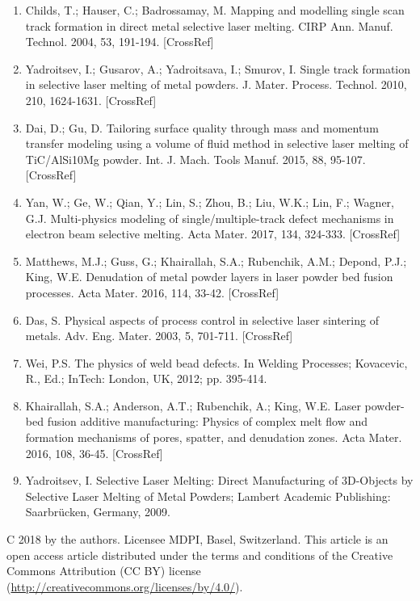 \documentclass[10pt]{article}
\begin{document}
\begin{enumerate}
  \item Childs, T.; Hauser, C.; Badrossamay, M. Mapping and modelling single scan track formation in direct metal selective laser melting. CIRP Ann. Manuf. Technol. 2004, 53, 191-194. [CrossRef]

  \item Yadroitsev, I.; Gusarov, A.; Yadroitsava, I.; Smurov, I. Single track formation in selective laser melting of metal powders. J. Mater. Process. Technol. 2010, 210, 1624-1631. [CrossRef]

  \item Dai, D.; Gu, D. Tailoring surface quality through mass and momentum transfer modeling using a volume of fluid method in selective laser melting of TiC/AlSi10Mg powder. Int. J. Mach. Tools Manuf. 2015, 88, 95-107. [CrossRef]

  \item Yan, W.; Ge, W.; Qian, Y.; Lin, S.; Zhou, B.; Liu, W.K.; Lin, F.; Wagner, G.J. Multi-physics modeling of single/multiple-track defect mechanisms in electron beam selective melting. Acta Mater. 2017, 134, 324-333. [CrossRef]

  \item Matthews, M.J.; Guss, G.; Khairallah, S.A.; Rubenchik, A.M.; Depond, P.J.; King, W.E. Denudation of metal powder layers in laser powder bed fusion processes. Acta Mater. 2016, 114, 33-42. [CrossRef]

  \item Das, S. Physical aspects of process control in selective laser sintering of metals. Adv. Eng. Mater. 2003, 5, 701-711. [CrossRef]

  \item Wei, P.S. The physics of weld bead defects. In Welding Processes; Kovacevic, R., Ed.; InTech: London, UK, 2012; pp. 395-414.

  \item Khairallah, S.A.; Anderson, A.T.; Rubenchik, A.; King, W.E. Laser powder-bed fusion additive manufacturing: Physics of complex melt flow and formation mechanisms of pores, spatter, and denudation zones. Acta Mater. 2016, 108, 36-45. [CrossRef]

  \item Yadroitsev, I. Selective Laser Melting: Direct Manufacturing of 3D-Objects by Selective Laser Melting of Metal Powders; Lambert Academic Publishing: Saarbrücken, Germany, 2009.

\end{enumerate}

C 2018 by the authors. Licensee MDPI, Basel, Switzerland. This article is an open access article distributed under the terms and conditions of the Creative Commons Attribution (CC BY) license (\href{http://creativecommons.org/licenses/by/4.0/}{http://creativecommons.org/licenses/by/4.0/}).
\end{document}
